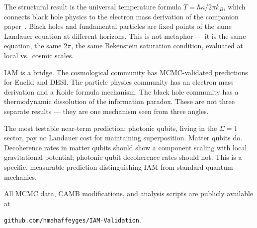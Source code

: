 \documentclass[12pt,letterpaper]{article}
\begin{document}
The structural result is the universal temperature formula
$T = \hbar\kappa/2\pi k_B$, which connects black hole physics
to the electron mass derivation of the companion paper~\cite{MahaffeyParticle2026}.
Black holes and fundamental particles are fixed points of the same
Landauer equation at different horizons.
This is not metaphor --- it is the same equation, the same $2\pi$,
the same Bekenstein saturation condition, evaluated at local
vs.\ cosmic scales.

IAM is a bridge. The cosmological community has MCMC-validated
predictions for Euclid and DESI. The particle physics community
has an electron mass derivation and a Koide formula mechanism.
The black hole community has a thermodynamic dissolution of the
information paradox. These are not three separate results --- they
are one mechanism seen from three angles.

The most testable near-term prediction: photonic qubits, living
in the $\Sigma = 1$ sector, pay no Landauer cost for maintaining
superposition. Matter qubits do. Decoherence rates in matter qubits
should show a component scaling with local gravitational potential;
photonic qubit decoherence rates should not. This is a specific,
measurable prediction distinguishing IAM from standard quantum mechanics.

All MCMC data, CAMB modifications, and analysis scripts are
publicly available at 

\texttt{github.com/hmahaffeyges/IAM-Validation}.
\end{document}
